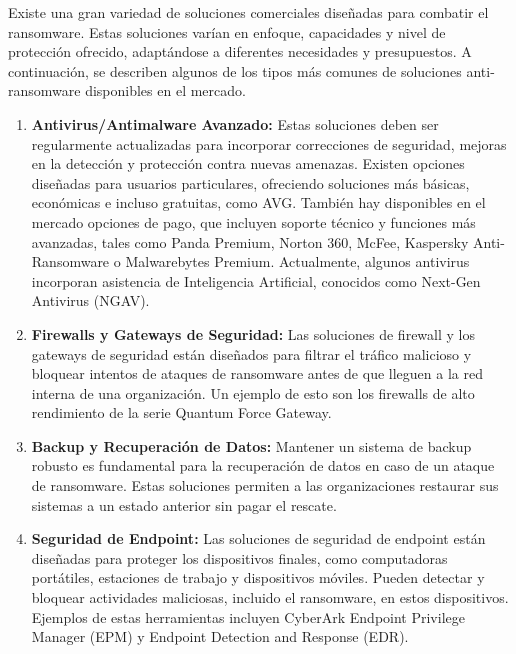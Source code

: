 
Existe una gran variedad de soluciones comerciales diseñadas para combatir el ransomware. Estas soluciones varían en enfoque, capacidades y nivel de protección ofrecido, adaptándose a diferentes necesidades y presupuestos. A continuación, se describen algunos de los tipos más comunes de soluciones anti-ransomware disponibles en el mercado.

\begin{enumerate}
  \item \textbf{Antivirus/Antimalware Avanzado:} Estas soluciones deben ser regularmente actualizadas para incorporar correcciones de seguridad, mejoras en la detección y protección contra nuevas amenazas. Existen opciones diseñadas para usuarios particulares, ofreciendo soluciones más básicas, económicas e incluso gratuitas, como AVG. También hay disponibles en el mercado opciones de pago, que incluyen soporte técnico y funciones más avanzadas, tales como Panda Premium, Norton 360, McFee, Kaspersky Anti-Ransomware o Malwarebytes Premium. Actualmente, algunos antivirus incorporan asistencia de Inteligencia Artificial, conocidos como Next-Gen Antivirus (NGAV).

  \item \textbf{Firewalls y Gateways de Seguridad:} Las soluciones de firewall y los gateways de seguridad están diseñados para filtrar el tráfico malicioso y bloquear intentos de ataques de ransomware antes de que lleguen a la red interna de una organización. Un ejemplo de esto son los firewalls de alto rendimiento de la serie Quantum Force Gateway.

  \item \textbf{Backup y Recuperación de Datos:} Mantener un sistema de backup robusto es fundamental para la recuperación de datos en caso de un ataque de ransomware. Estas soluciones permiten a las organizaciones restaurar sus sistemas a un estado anterior sin pagar el rescate.

  \item \textbf{Seguridad de Endpoint:} Las soluciones de seguridad de endpoint están diseñadas para proteger los dispositivos finales, como computadoras portátiles, estaciones de trabajo y dispositivos móviles. Pueden detectar y bloquear actividades maliciosas, incluido el ransomware, en estos dispositivos. Ejemplos de estas herramientas incluyen CyberArk Endpoint Privilege Manager (EPM) y Endpoint Detection and Response (EDR).
\end{enumerate}
